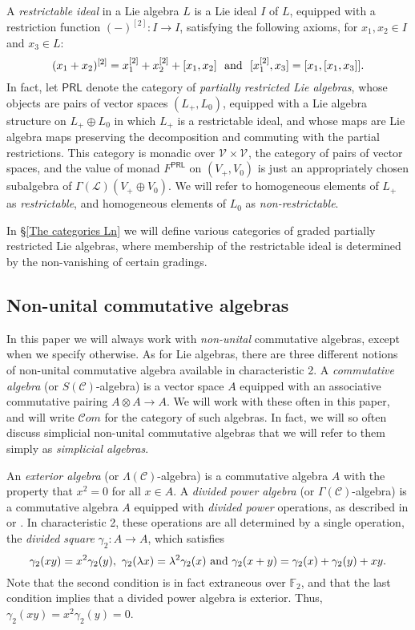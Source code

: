 \documentclass[11pt]{amsart} \renewcommand{\baselinestretch}{1.4}
\theoremstyle{plain}
\theoremstyle{definition}
\newcommand{\DASH}{\mathrm{-}}
\renewcommand{\to}{\longrightarrow}
\newcommand{\scrL}{\mathscr{L}}
\newcommand{\scrC}{\mathscr{C}}
\newcommand{\calV}{\mathcal{V}}
\newcommand{\citeBOX}[2][]{\cite[\mbox{#1}]{#2}}
\newcommand{\LieOperad}{{\scrL}}
\newcommand{\CommOperad}{{\scrC}}
\newcommand{\restn}[1]{#1^{[2]}}
\newcommand{\vect}[2]{\calV^{#1}_{#2}}
\newcommand{\F}{\mathbb{F}}
\newcommand{\algs}{{\scrC\!\textit{om}}}
\newcommand{\Ftwo}{\F_2}
\begin{document}
\begin{Conventions and notation}
A \emph{restrictable ideal} in a Lie algebra $L$ is a Lie ideal $I$ of $L$, equipped with a restriction function $\restn{(\DASH)}:I\to I$, satisfying the following axioms, for $x_1,x_2\in I$ and $x_3\in L$:
\[\restn{(x_1+x_2)}=\restn{x_1}+\restn{x_2}+[x_1,x_2]\textup{ \ and \ }[\restn{x_1},x_3]=[x_1,[x_1,x_3]].\]
In fact, let $\mathsf{PRL}$ denote the category of \emph{partially restricted Lie algebras}, whose objects are pairs of vector spaces $(L_+,L_0)$, equipped with a Lie algebra structure on $L_+\oplus L_0$ in which $L_+$ is a restrictable ideal, and whose maps are Lie algebra maps preserving the decomposition and commuting with the partial restrictions. This category is monadic over $\vect{}{}\times\vect{}{}$, the category of pairs of vector spaces, and the value of monad $F^{\mathsf{PRL}}$  on $(V_+,V_0)$ is just an appropriately chosen subalgebra of $\Gamma(\LieOperad)(V_+\oplus V_0)$. We will refer to homogeneous elements of $L_+$ as \emph{restrictable}, and homogeneous elements of $L_0$ as \emph{non-restrictable}.

In \S\ref{The categories Ln} we will define various categories of graded partially restricted Lie algebras, where membership of the restrictable ideal is determined by the non-vanishing of certain gradings.


\subsection{Non-unital commutative algebras}
In this paper we will always work with \emph{non-unital} commutative algebras, except when we specify otherwise. As for Lie algebras, there are three different notions of non-unital commutative algebra available in characteristic 2. A \emph{commutative algebra} (or $S(\CommOperad)$-algebra) is a vector space $A$ equipped with an associative commutative pairing $A\otimes A\to A$.  We will work with these often in this paper, and will write $\algs$ for the category of such algebras. In fact, we will so often discuss simplicial non-unital commutative algebras that we will refer to them simply as \emph{simplicial algebras}.

An \emph{exterior algebra} (or $\Lambda(\CommOperad)$-algebra) is a commutative algebra $A$ with the property that $x^2=0$ for all $x\in A$. A \emph{divided power algebra} (or $\Gamma(\CommOperad)$-algebra) is a commutative algebra $A$ equipped with \emph{divided power} operations, as described in \citeBOX[1.2.2]{FresseSimplicialAlgs.pdf} or \citeBOX[\S2]{MR1089001}. In characteristic 2, these operations are all determined by a single operation, the \emph{divided square} $\gamma_2:A\to A$, which satisfies
\[\gamma_2(xy)=x^2\gamma_2(y),\ \gamma_2(\lambda x)=\lambda^2\gamma_2(x)\textup{ and }\gamma_2(x+y)=\gamma_2(x)+\gamma_2(y)+xy.\]
Note that the second condition is in fact extraneous over $\Ftwo $, and that the last condition implies that a divided power algebra is exterior. Thus, $\gamma_2(xy)=x^2\gamma_2(y)=0$.


\end{Conventions and notation}
\end{document}
